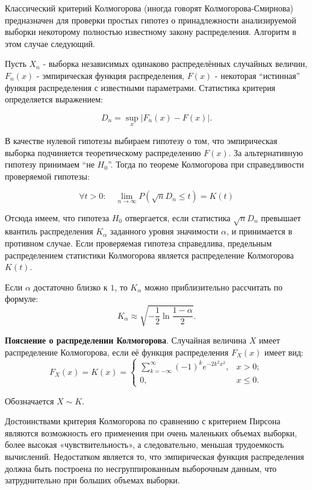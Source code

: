 \documentclass[11pt]{article}
\begin{document}
Классический критерий Колмогорова (иногда говорят Колмогорова-Смирнова)
предназначен для проверки простых гипотез о принадлежности анализируемой
выборки некоторому полностью известному закону распределения. Алгоритм в
этом случае следующий.

Пусть \(X_n\) - выборка независимых одинаково распределённых случайных
величин, \(F_n(x)\) - эмпирическая функция распределения, \(F(x)\) -
некоторая ``истинная'' функция распределения с известными параметрами.
Статистика критерия определяется выражением:

\[
D_n=\sup_x |F_n(x)-F(x)|.
\]

В качестве нулевой гипотезы выбираем гипотезу о том, что эмпирическая
выборка подчиняется теоретическому распределению \(F(x)\). За
альтернативную гипотезу принимаем ``не \(H_0\)''. Тогда по теореме
Колмогорова при справедливости проверяемой гипотезы:

\[
\forall t>0: \quad \lim_{n \to \infty}P(\sqrt{n} D_n \leq t)=K(t)
\]

Отсюда имеем, что гипотеза \(H_0\) отвергается, если статистика
\(\sqrt{n}D_n\!\) превышает квантиль распределения \(K_\alpha\)
заданного уровня значимости \(\alpha\), и принимается в противном
случае. Если проверяемая гипотеза справедлива, предельным распределением
статистики Колмогорова является распределение Колмогорова \(K(t)\).

Если \({\displaystyle \alpha}\) достаточно близко к \(1\), то
\({\displaystyle K_{\alpha }}\) можно приблизительно рассчитать по
формуле: \[
{\displaystyle K_{\alpha }\approx {\sqrt {-{\frac {1}{2}}\ln {\frac {1-\alpha }{2}}}}.}
\]

\textbf{Пояснение о распределении Колмогорова}. Случайная величина \(X\)
имеет распределение Колмогорова, если её функция распределения
\(F_X(x)\) имеет вид: \[
{
    \displaystyle F_X(x) = K(x) =
    {
        \begin{cases}
            \sum \limits_{k=-\infty }^{\infty}(-1)^{k}e^{-2k^{2}x^{2}}, & x>0; \\
            0, & x \leqslant 0. 
        \end{cases}
    }
}
\]

Обозначается \(X \sim K\).

Достоинствами критерия Колмогорова по сравнению с критерием Пирсона
являются возможность его применения при очень маленьких объемах выборки,
более высокая «чувствительность», а следовательно, меньшая трудоемкость
вычислений. Недостатком является то, что эмпирическая функция
распределения должна быть построена по несгруппированным выборочным
данным, что затруднительно при больших объемах выборки.
\end{document}
